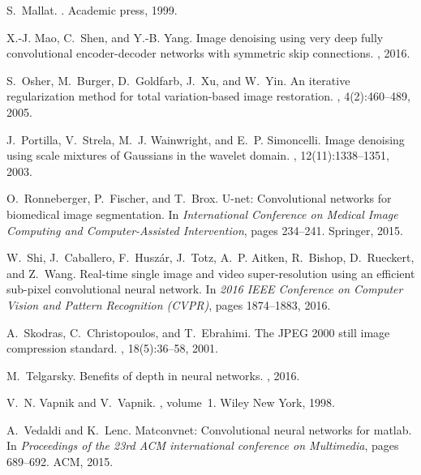 \documentclass[10pt,twocolumn,letterpaper]{article}
\begin{document}
\begin{thebibliography}{10}
S.~Mallat.
.
\newblock Academic press, 1999.

X.-J. Mao, C.~Shen, and Y.-B. Yang.
\newblock Image denoising using very deep fully convolutional encoder-decoder
  networks with symmetric skip connections.
, 2016.

S.~Osher, M.~Burger, D.~Goldfarb, J.~Xu, and W.~Yin.
\newblock An iterative regularization method for total variation-based image
  restoration.
, 4(2):460--489, 2005.

J.~Portilla, V.~Strela, M.~J. Wainwright, and E.~P. Simoncelli.
\newblock Image denoising using scale mixtures of {Gaussian}s in the wavelet
  domain.
, 12(11):1338--1351, 2003.

O.~Ronneberger, P.~Fischer, and T.~Brox.
\newblock U-net: Convolutional networks for biomedical image segmentation.
\newblock In {\em International Conference on Medical Image Computing and
  Computer-Assisted Intervention}, pages 234--241. Springer, 2015.

W.~Shi, J.~Caballero, F.~Husz{\'a}r, J.~Totz, A.~P. Aitken, R.~Bishop,
  D.~Rueckert, and Z.~Wang.
\newblock Real-time single image and video super-resolution using an efficient
  sub-pixel convolutional neural network.
\newblock In {\em 2016 IEEE Conference on Computer Vision and Pattern
  Recognition (CVPR)}, pages 1874--1883, 2016.

A.~Skodras, C.~Christopoulos, and T.~Ebrahimi.
\newblock The {JPEG} 2000 still image compression standard.
, 18(5):36--58, 2001.

M.~Telgarsky.
\newblock Benefits of depth in neural networks.
, 2016.

V.~N. Vapnik and V.~Vapnik.
, volume~1.
\newblock Wiley New York, 1998.

A.~Vedaldi and K.~Lenc.
\newblock Matconvnet: Convolutional neural networks for matlab.
\newblock In {\em Proceedings of the 23rd ACM international conference on
  Multimedia}, pages 689--692. ACM, 2015.


\end{thebibliography}
\end{document}
